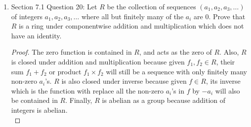 \documentclass{article}
\begin{document}
\begin{enumerate}[label={\bf Q\arabic*:}]
\begin{enumerate}
      \item Prove that $1+x$ is a unit in $R$.
        \begin{proof}
          Let $m\in\mathbb{Z}^+$ such that $r^m=0$. Consider $y\in R$
          defined by \[y=\sum_{k=0}^{m-1} (-x)^k.\] Then
          \begin{align*}
            (1+x)y  &= (1+x)\sum_{k=0}^{m-1} (-x)^k & \\
                    &= \sum_{k=0}^{m-1} (-x)^k + \sum_{k=1}^m (-x)^k & \\
                    &= 1+(-x)^m & \\
                    &= 1+(-1)^mx^m & (\text{by commutativity}) \\
                    &= 1. & (\because x^m=0) \\
          \end{align*}
          Similarly, we also get $y(1-x)=0$, hence $(1+x)$ has
          multplicative inverse $y$, which means $(1+x)$ is a unit in $R$.
        \end{proof}

      \item Deduce that the sum of a nilpotent element and a unit is a
        unit.
        \begin{proof}
          Let $u$ be any unit in $R$ and $v$ be its multiplicative inverse.
          By part (b) of this question, $vx$ is nilpotent, then by part (c)
          of this question, $1+vx$ is nilpotent, and thus by part (b) of
          this question, $u(1+vx)=u+x$ must also be nilpotent.
        \end{proof}
    \end{enumerate}

  \item Section 7.1 Question 20: Let $R$ be the collection of sequences
    $(a_1,a_2,a_3,\ldots)$ of integers $a_1,a_2,a_3,\ldots$ where all but
    finitely many of the $a_i$ are 0. Prove that $R$ is a ring under
    componentwise addition and multiplication which does not have an
    identity.

    \begin{proof}
      The zero function is contained in $R$, and acts as the zero of $R$.
      Also, $R$ is closed under addition and multiplication because given
      $f_1,f_2\in R$, their sum $f_1+f_2$ or product $f_1\times f_2$ will
      still be a sequence with only finitely many non-zero $a_i$'s. $R$ is
      also closed under inverse because given $f\in R$, its inverse which
      is the function with replace all the non-zero $a_i$'s in $f$ by
      $-a_i$ will also be contained in $R$.  Finally, $R$ is abelian as a
      group because addition of integers is abelian. \\


\end{proof}
\end{enumerate}
\end{document}

